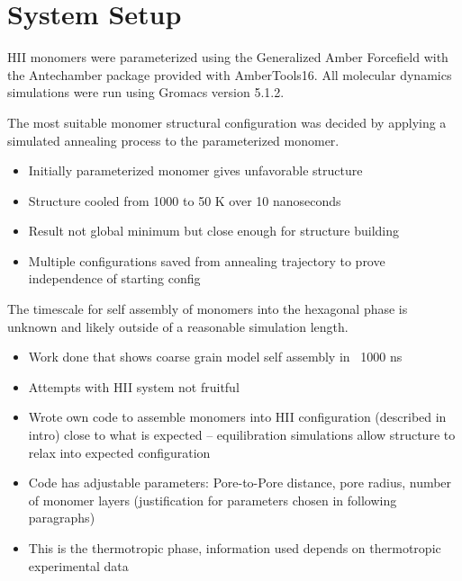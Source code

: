 \documentclass{article}
\begin{document}
	\section{System Setup}
	
	HII monomers were parameterized using the Generalized Amber Forcefield with the Antechamber package provided with AmberTools16. All molecular dynamics simulations were run using Gromacs version 5.1.2.

	The most suitable monomer structural configuration was decided by applying a simulated annealing process to the parameterized monomer. 
	\begin{itemize}
		\item Initially parameterized monomer gives unfavorable structure
		\item Structure cooled from 1000 to 50 K over 10 nanoseconds
		\item Result not global minimum but close enough for structure building
		\item Multiple configurations saved from annealing trajectory to prove independence of starting config
	\end{itemize}
	
	The timescale for self assembly of monomers into the hexagonal phase is unknown and likely outside of a reasonable simulation length. 
	\begin{itemize}
		\item Work done that shows coarse grain model self assembly in ~1000 ns %
		\item Attempts with HII system not fruitful  %
		\item Wrote own code to assemble monomers into HII configuration (described in intro) close to what is expected -- equilibration simulations allow structure to relax into expected configuration 
		\item Code has adjustable parameters: Pore-to-Pore distance, pore radius, number of monomer layers (justification for parameters chosen in following paragraphs)
		\item This is the thermotropic phase, information used depends on thermotropic experimental data
	\end{itemize}
	
\end{document}
